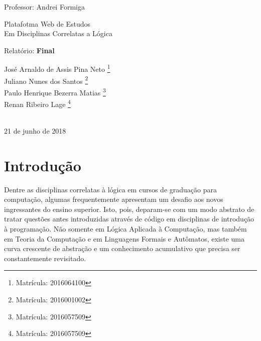 \documentclass[11pt, a4paper]{article}
\begin{document}
\begin{titlepage}
\begin{center}
    	    {\sc Professor: Andrei Formiga}

	        \vspace{4cm}

        	{\LARGE \sc Platafotma Web de Estudos \\ {\Large Em Disciplinas Correlatas a Lógica} \\}

					\vspace{3cm}

	        \begin{flushleft}

            	{\sf \sc \large Relatório: \bf{Final} \\}

        	\end{flushleft}

    	    \vspace{2cm}

	        \begin{flushleft}

            	{\sf {} José Arnaldo de Assis Pina Neto 									\footnote{Matrícula: 2016064100}\\
																		Juliano Nunes dos Santos
																		\footnote{Matrícula: 2016001002}\\
																		Paulo Henrique Bezerra Matias
																		\footnote{Matrícula: 2016057509}\\
																		Renan Ribeiro Lage
																		\footnote{Matrícula: 2016057509}}

        	\end{flushleft}

    	    \vspace{1.5cm}

	         \\
        	21 de junho de 2018

    	\end{center}
	\end{titlepage}


	\pagebreak


	\section{Introdução}

		Dentre as disciplinas correlatas à lógica em cursos de graduação para computação, algumas frequentemente apresentam um desafio aos novos ingressantes do ensino superior. Isto, pois, deparam-se com um modo abstrato de tratar questões antes introduzidas através de código em disciplinas de introdução à programação. Não somente em Lógica Aplicada à Computação, mas também em Teoria da Computação e em Linguagens Formais e Autômatos, existe uma curva crescente de abstração e um conhecimento acumulativo que precisa ser constantemente revisitado.\\
\end{document}
